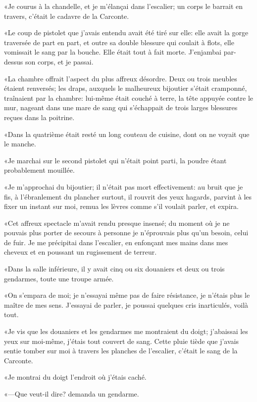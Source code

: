 «Je courus à la chandelle, et je m'élançai dans l'escalier; un corps le barrait en travers, c'était le cadavre de la Carconte. 

«Le coup de pistolet que j'avais entendu avait été tiré sur elle: elle avait la gorge traversée de part en part, et outre sa double blessure qui coulait à flots, elle vomissait le sang par la bouche. Elle était tout à fait morte. J'enjambai par-dessus son corps, et je passai. 

«La chambre offrait l'aspect du plus affreux désordre. Deux ou trois meubles étaient renversés; les draps, auxquels le malheureux bijoutier s'était cramponné, traînaient par la chambre: lui-même était couché à terre, la tête appuyée contre le mur, nageant dans une mare de sang qui s'échappait de trois larges blessures reçues dans la poitrine. 

«Dans la quatrième était resté un long couteau de cuisine, dont on ne voyait que le manche. 

«Je marchai sur le second pistolet qui n'était point parti, la poudre étant probablement mouillée. 

«Je m'approchai du bijoutier; il n'était pas mort effectivement: au bruit que je fis, à l'ébranlement du plancher surtout, il rouvrit des yeux hagards, parvint à les fixer un instant sur moi, remua les lèvres comme s'il voulait parler, et expira. 

«Cet affreux spectacle m'avait rendu presque insensé; du moment où je ne pouvais plus porter de secours à personne je n'éprouvais plus qu'un besoin, celui de fuir. Je me précipitai dans l'escalier, en enfonçant mes mains dans mes cheveux et en poussant un rugissement de terreur. 

«Dans la salle inférieure, il y avait cinq ou six douaniers et deux ou trois gendarmes, toute une troupe armée. 

«On s'empara de moi; je n'essayai même pas de faire résistance, je n'étais plus le maître de mes sens. J'essayai de parler, je poussai quelques cris inarticulés, voilà tout. 

«Je vis que les douaniers et les gendarmes me montraient du doigt; j'abaissai les yeux sur moi-même, j'étais tout couvert de sang. Cette pluie tiède que j'avais sentie tomber sur moi à travers les planches de l'escalier, c'était le sang de la Carconte. 

«Je montrai du doigt l'endroit où j'étais caché. 

«—Que veut-il dire? demanda un gendarme. 

